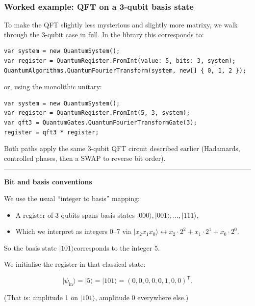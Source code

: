\documentclass[a4paper,11pt]{article}
\begin{document}
\subsubsection{Worked example: QFT on a 3-qubit basis state}

To make the QFT slightly less mysterious and slightly more matrixy, we walk through the 3-qubit case in full. In the library this corresponds to:

\begin{lstlisting}[style=codeblock]
var system = new QuantumSystem();
var register = QuantumRegister.FromInt(value: 5, bits: 3, system);
QuantumAlgorithms.QuantumFourierTransform(system, new[] { 0, 1, 2 });
\end{lstlisting}

or, using the monolithic unitary:

\begin{lstlisting}[style=codeblock]
var system = new QuantumSystem();
var register = QuantumRegister.FromInt(5, 3, system);
var qft3 = QuantumGates.QuantumFourierTransformGate(3);
register = qft3 * register;
\end{lstlisting}

Both paths apply the same 3-qubit QFT circuit described earlier (Hadamards, controlled phases, then a SWAP to reverse bit order).

\begin{center}\rule{0.5\linewidth}{0.5pt}\end{center}

\textbf{Bit and basis conventions}

We use the usual ``integer to basis'' mapping:

\begin{itemize}
\item
  A register of 3 qubits spans basis states \(\mid 000\rangle, \mid 001\rangle,\ldots, \mid 111\rangle\),
\item
  Which we interpret as integers 0--7 via \(\mid x_{2}x_{1}x_{0}\rangle \leftrightarrow x_{2} \cdot 2^{2} + x_{1} \cdot 2^{1} + x_{0} \cdot 2^{0}\).
\end{itemize}

So the basis state \(\mid 101\rangle\)corresponds to the integer 5.

We initialise the register in that classical state:

\[\mid \psi_{\text{in}}\rangle = \mid 5\rangle = \mid 101\rangle = (0,0,0,0,0,1,0,0)^{\mathsf{T}}.
\]

(That is: amplitude 1 on \(\mid 101\rangle\), amplitude 0 everywhere else.)
\end{document}
